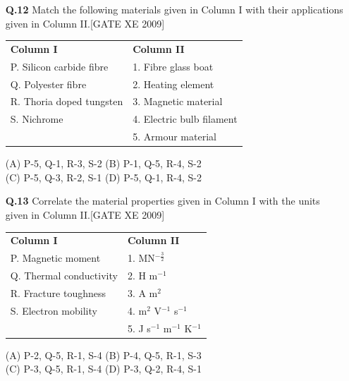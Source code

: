 \documentclass[journal,12pt,onecolumn]{IEEEtran}
\theoremstyle{remark}
\begin{document}
\begin{enumerate}
\begin{enumerate}
\vspace{2em}

\item[\textbf{Q.12}] Match the following materials given in Column I with their applications given in Column II.\hfill[GATE XE 2009]

\vspace{1em}

\begin{tabular}{p{6cm} p{6cm}}
\textbf{Column I} & \textbf{Column II} \\
P. Silicon carbide fibre & 1. Fibre glass boat \\
Q. Polyester fibre & 2. Heating element \\
R. Thoria doped tungsten & 3. Magnetic material \\
S. Nichrome & 4. Electric bulb filament \\
& 5. Armour material \\
\end{tabular}

\vspace{1em}

\noindent
(A) P-5, Q-1, R-3, S-2 \hfill
(B) P-1, Q-5, R-4, S-2 \\
(C) P-5, Q-3, R-2, S-1 \hfill
(D) P-5, Q-1, R-4, S-2

\vspace{2em}

\item[\textbf{Q.13}] Correlate the material properties given in Column I with the units given in Column II.\hfill[GATE XE 2009]

\vspace{1em}

\begin{tabular}{p{6cm} p{6cm}}
\textbf{Column I} & \textbf{Column II} \\
P. Magnetic moment & 1. MN$^{-\tfrac{3}{2}}$ \\
Q. Thermal conductivity & 2. H m$^{-1}$ \\
R. Fracture toughness & 3. A m$^2$ \\
S. Electron mobility & 4. m$^2$ V$^{-1}$ s$^{-1}$ \\
& 5. J s$^{-1}$ m$^{-1}$ K$^{-1}$ \\
\end{tabular}

\vspace{1em}

\noindent
(A) P-2, Q-5, R-1, S-4 \hfill
(B) P-4, Q-5, R-1, S-3 \\
(C) P-3, Q-5, R-1, S-4 \hfill
(D) P-3, Q-2, R-4, S-1


\end{enumerate}
\end{enumerate}
\end{document}
